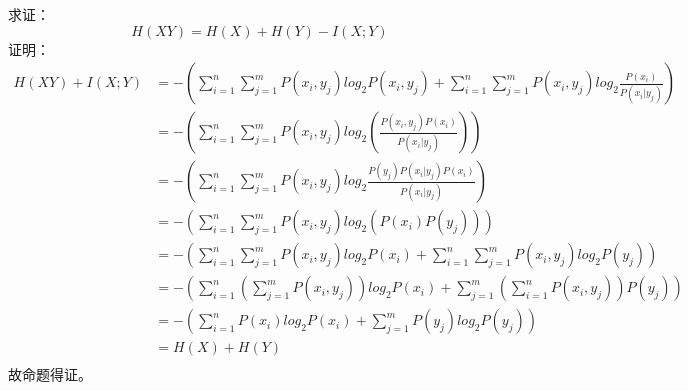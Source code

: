 \documentclass{article}
\date{\today}
\begin{document}
\makecover
求证：\[H(XY)=H(X)+H(Y)-I(X;Y)\]
证明：
\begin{align*}
H(XY)+I(X;Y)&=-(\sum_{i=1}^n \sum_{j=1}^m P(x_i, y_j)log_2P(x_i,y_j)+\sum_{i=1}^n \sum_{j=1}^m P(x_i,y_j)log_2\frac{P(x_i)}{P(x_i|y_j)})\\
&=-(\sum_{i=1}^n\sum_{j=1}^m P(x_i,y_j)log_2(\frac{P(x_i,y_j)P(x_i)}{P(x_i|y_j)}))\\
&=-(\sum_{i=1}^n\sum_{j=1}^mP(x_i,y_j)log_2\frac{P(y_j)P(x_i|y_j)P(x_i)}{P(x_i|y_j)})\\
&=-(\sum_{i=1}^n\sum_{j=1}^mP(x_i,y_j)log_2(P(x_i)P(y_j)))\\
&=-(\sum_{i=1}^n\sum_{j=1}^mP(x_i,y_j)log_2P(x_i) + \sum_{i=1}^n\sum_{j=1}^m P(x_i,y_j)log_2P(y_j))\\
&=-(\sum_{i=1}^n(\sum_{j=1}^m P(x_i,y_j))log_2P(x_i) + \sum_{j=1}^m(\sum_{i=1}^nP(x_i,y_j))P(y_j))\\
&=-(\sum_{i=1}^nP(x_i)log_2P(x_i) + \sum_{j=1}^mP(y_j)log_2P(y_j))\\
&=H(X)+H(Y)\\
\end{align*}
故命题得证。
\end{document}
